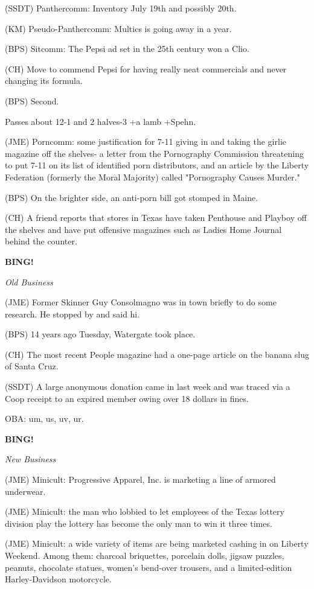 \documentclass[12pt]{article}
\newcommand{\bing}{{\bf BING!} }
\newcommand{\goto}[1]{\bing \vskip 12pt \centerline{{\em{#1}}}}
\begin{document}
(SSDT) Panthercomm: Inventory July 19th and possibly 20th.

(KM) Pseudo-Panthercomm: Multics is going away in a year.

(BPS) Sitcomm: The Pepsi ad set in the 25th century won a Clio.

(CH) Move to commend Pepsi for having really neat commercials and never changing its formula.

(BPS) Second.

Passes about 12-1 and 2 halves-3 +a lamb +Spehn.

(JME) Porncomm: some justification for 7-11 giving in and taking the girlie magazine off the shelves- a letter from the Pornography Commission threatening to put 7-11 on its list of identified porn distributors, and an article by the Liberty Federation (formerly the Moral Majority) called "Pornography Causes Murder."

(BPS) On the brighter side, an anti-porn bill got stomped in Maine.

(CH) A friend reports that stores in Texas have taken Penthouse and Playboy off the shelves and have put offensive magazines such as Ladies Home Journal behind the counter.

\goto{Old Business}

(JME) Former Skinner Guy Consolmagno was in town briefly to do some research. He stopped by and said hi.

(BPS) 14 years ago Tuesday, Watergate took place.

(CH) The most recent People magazine had a one-page article on the banana slug of Santa Cruz.

(SSDT) A large anonymous donation came in last week and was traced via a Coop receipt to an expired member owing over 18 dollars in fines.

OBA: um, us, uv, ur.

\goto{New Business}

(JME) Minicult: Progressive Apparel, Inc. is marketing a line of armored underwear.

(JME) Minicult: the man who lobbied to let employees of the Texas lottery division play the lottery has become the only man to win it three times.

(JME) Minicult: a wide variety of items are being marketed cashing in on Liberty Weekend. Among them: charcoal briquettes, porcelain dolls, jigsaw puzzles, peanuts, chocolate statues, women's bend-over trousers, and a limited-edition Harley-Davidson motorcycle.
\end{document}
